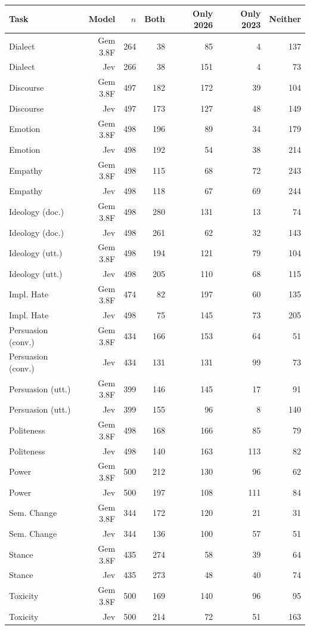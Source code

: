 \begin{tabular}{lrrrrrr}
\toprule
Task & Model & $n$ & Both & Only 2026 & Only 2023 & Neither \\
\midrule
Dialect & Gem 3.8F & 264 & 38 & 85 & 4 & 137 \\
Dialect & Jev & 266 & 38 & 151 & 4 & 73 \\
Discourse & Gem 3.8F & 497 & 182 & 172 & 39 & 104 \\
Discourse & Jev & 497 & 173 & 127 & 48 & 149 \\
Emotion & Gem 3.8F & 498 & 196 & 89 & 34 & 179 \\
Emotion & Jev & 498 & 192 & 54 & 38 & 214 \\
Empathy & Gem 3.8F & 498 & 115 & 68 & 72 & 243 \\
Empathy & Jev & 498 & 118 & 67 & 69 & 244 \\
Ideology (doc.) & Gem 3.8F & 498 & 280 & 131 & 13 & 74 \\
Ideology (doc.) & Jev & 498 & 261 & 62 & 32 & 143 \\
Ideology (utt.) & Gem 3.8F & 498 & 194 & 121 & 79 & 104 \\
Ideology (utt.) & Jev & 498 & 205 & 110 & 68 & 115 \\
Impl. Hate & Gem 3.8F & 474 & 82 & 197 & 60 & 135 \\
Impl. Hate & Jev & 498 & 75 & 145 & 73 & 205 \\
Persuasion (conv.) & Gem 3.8F & 434 & 166 & 153 & 64 & 51 \\
Persuasion (conv.) & Jev & 434 & 131 & 131 & 99 & 73 \\
Persuasion (utt.) & Gem 3.8F & 399 & 146 & 145 & 17 & 91 \\
Persuasion (utt.) & Jev & 399 & 155 & 96 & 8 & 140 \\
Politeness & Gem 3.8F & 498 & 168 & 166 & 85 & 79 \\
Politeness & Jev & 498 & 140 & 163 & 113 & 82 \\
Power & Gem 3.8F & 500 & 212 & 130 & 96 & 62 \\
Power & Jev & 500 & 197 & 108 & 111 & 84 \\
Sem. Change & Gem 3.8F & 344 & 172 & 120 & 21 & 31 \\
Sem. Change & Jev & 344 & 136 & 100 & 57 & 51 \\
Stance & Gem 3.8F & 435 & 274 & 58 & 39 & 64 \\
Stance & Jev & 435 & 273 & 48 & 40 & 74 \\
Toxicity & Gem 3.8F & 500 & 169 & 140 & 96 & 95 \\
Toxicity & Jev & 500 & 214 & 72 & 51 & 163 \\
\bottomrule
\end{tabular}
